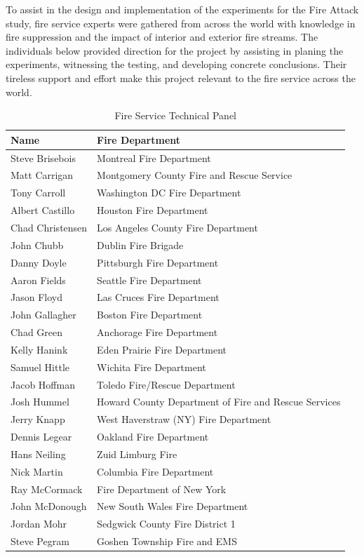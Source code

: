 \documentclass[12pt,oneside]{book}
\begin{document}
\clearpage

To assist in the design and implementation of the experiments for the Fire Attack study, fire service experts were gathered from across the world with knowledge in fire suppression and the impact of interior and exterior fire streams. The individuals below provided direction for the project by assisting in planing the experiments, witnessing the testing, and developing concrete conclusions. Their tireless support and effort make this project relevant to the fire service across the world. 


\begin{table}[!ht]
	\centering
	\caption*{Fire Service Technical Panel}
	\begin{tabular}{ll}
		\toprule[1.5pt]
		Name & Fire Department \\ 
		\midrule
		Steve Brisebois  & Montreal Fire Department \\ 
		Matt Carrigan    & Montgomery County Fire and Rescue Service \\ 
		Tony Carroll     & Washington DC Fire Department \\ 
		Albert Castillo  & Houston Fire Department \\ 
		Chad Christensen & Los Angeles County Fire Department \\ 
		John Chubb       & Dublin Fire Brigade \\ 		 		  
		Danny Doyle      & Pittsburgh Fire Department \\ 
		Aaron Fields     & Seattle Fire Department \\ 
		Jason Floyd      & Las Cruces Fire Department \\ 
		John Gallagher   & Boston Fire Department \\ 
		Chad Green       & Anchorage Fire Department \\ 
		Kelly Hanink     & Eden Prairie Fire Department \\ 
		Samuel Hittle    & Wichita Fire Department \\ 
		Jacob Hoffman    & Toledo Fire/Rescue Department \\ 
		Josh Hummel      & Howard County Department of Fire and Rescue Services \\ 
		Jerry Knapp      & West Haverstraw (NY) Fire Department \\ 
		Dennis Legear    & Oakland Fire Department \\ 
		Hans Neiling     & Zuid Limburg Fire \\ 
		Nick Martin      & Columbia Fire Department \\ 
		Ray McCormack    & Fire Department of New York \\ 
		John McDonough   & New South Wales Fire Department \\ 
		Jordan Mohr      & Sedgwick County Fire District 1 \\ 
		Steve Pegram     & Goshen Township Fire and EMS \\ 
		\bottomrule[1.25pt]
	\end{tabular}
\end{table}
\end{document}
